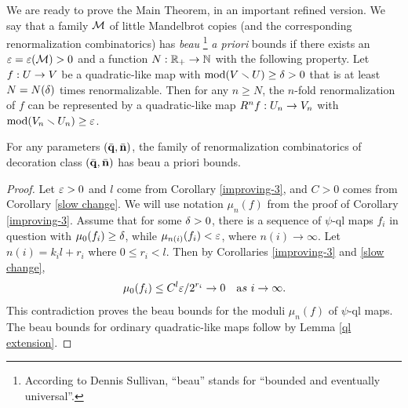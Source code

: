 We are ready to prove the Main Theorem, in an important refined version.
We say that a family ${\mathcal M}$ of little Mandelbrot copies (and the corresponding
renormalization combinatorics) has {\it beau}%
\footnote{According to Dennis Sullivan,
   ``beau'' stands for ``bounded and eventually universal''. }
{\it a priori} bounds
if there exists an ${\varepsilon} ={\varepsilon}({\mathcal M})>0$ and a function $N: {\Bbb R}_+\rightarrow {\Bbb N}$
with the following property.
Let $f: U\rightarrow V$ be a quadratic-like map with $\operatorname{mod}(V\smallsetminus U)\geq {\delta}>0$
that is  at least $N=N({\delta})$ times renormalizable. Then for any $n\geq N$,
the $n$-fold renormalization of $f$ can be represented  by a quadratic-like map $R^n f: U_n\rightarrow V_n$ with
$\operatorname{mod}(V_n\smallsetminus U_n)\geq {\varepsilon}$.

\begin{bbrmt}
  For any parameters $(\bar{{\mathbf{q}}}, \bar{{\mathbf{n}}})$,
the family of renormalization combinatorics of decoration class $(\bar{{\mathbf{q}}}, \bar{{\mathbf{n}}})$ has
beau a priori bounds.
\end{bbrmt}

\begin{proof}
   Let ${\varepsilon}>0$ and $l$ come from Corollary \ref{improving-3},
and $C>0$ comes from  Corollary \ref{slow change}.
We will use notation $\mu_n(f)$ from the proof of Corollary \ref{improving-3}.
Assume that for some ${\delta}>0$, there is a sequence of $\psi$-ql maps $f_i$ in question with $\mu_0(f_i)\geq {\delta}$,
while $\mu_{n(i)}(f_i)<{\varepsilon}$, where $n(i)\to \infty$. Let $n(i)=k_i l+r_i$ where $0\leq r_i<l$.
Then by  Corollaries \ref{improving-3} and \ref{slow change},
$$
   \mu_0(f_i)\leq C^l {\varepsilon} /2^{r_i} \to 0\quad {\mathrm as}\ i\to \infty.
$$
This contradiction proves the beau bounds for the moduli $\mu_n(f)$ of $\psi$-ql maps.
The beau bounds for ordinary quadratic-like maps follow by Lemma \ref{ql extension}.
\end{proof}
